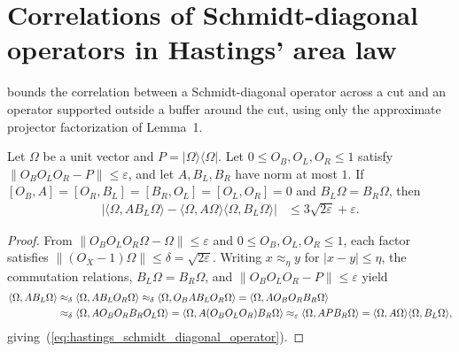\section{Correlations of Schmidt-diagonal operators in Hastings' area law}
\label{sec:hastings_schmidt_diagonal}


\cite[Lemma~3]{Hastings2007AreaLaw} bounds the correlation between a
Schmidt-diagonal operator across a cut and an operator supported outside a
buffer around the cut, using only the approximate projector factorization of
Lemma~1.

\begin{lemma}
    \label{thm:hastings_schmidt_diagonal_operator}
    \leanok
    Let $\Omega$ be a unit vector and $P=|\Omega\rangle\langle\Omega|$. Let
    $0\le O_B,O_L,O_R\le1$ satisfy $\|O_BO_LO_R-P\|\le\varepsilon$, and let
    $A,B_L,B_R$ have norm at most $1$. If
    $[O_B,A]=[O_R,B_L]=[B_R,O_L]=[O_L,O_R]=0$ and $B_L\Omega=B_R\Omega$, then
    \begin{align}
        \bigl|\langle\Omega,AB_L\Omega\rangle-\langle\Omega,A\Omega\rangle
        \langle\Omega,B_L\Omega\rangle\bigr|
         & \le3\sqrt{2\varepsilon}+\varepsilon.
        \label{eq:hastings_schmidt_diagonal_operator}
    \end{align}
\end{lemma}
\begin{proof}\leanok
    From $\|O_BO_LO_R\Omega-\Omega\|\le\varepsilon$ and $0\le O_B,O_L,O_R\le1$,
    each factor satisfies $\|(O_X-1)\Omega\|\le\delta=\sqrt{2\varepsilon}$.
    Writing $x\approx_\eta y$ for $|x-y|\le\eta$, the commutation relations,
    $B_L\Omega=B_R\Omega$, and $\|O_BO_LO_R-P\|\le\varepsilon$ yield
    \begin{align}
        \langle\Omega,AB_L\Omega\rangle
         & \approx_\delta\langle\Omega,AB_LO_R\Omega\rangle
        \approx_\delta\langle\Omega,O_BAB_LO_R\Omega\rangle
        =\langle\Omega,AO_BO_RB_R\Omega\rangle
        \notag                                                    \\
         & \approx_\delta\langle\Omega,AO_BO_RB_RO_L\Omega\rangle
        =\langle\Omega,A(O_BO_LO_R)B_R\Omega\rangle
        \approx_\varepsilon\langle\Omega,APB_R\Omega\rangle
        =\langle\Omega,A\Omega\rangle\langle\Omega,B_L\Omega\rangle,
        \notag
    \end{align}
    giving~(\ref{eq:hastings_schmidt_diagonal_operator}).
\end{proof}

